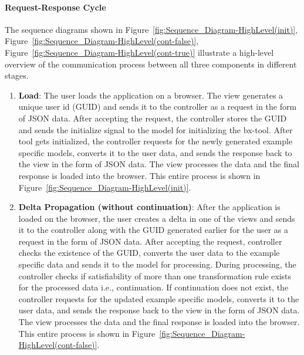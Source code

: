 \paragraph{Request-Response Cycle} 
The sequence diagrams shown in Figure~\ref{fig:Sequence_Diagram-HighLevel(init)}, Figure~\ref{fig:Sequence_Diagram-HighLevel(cont-false)}, Figure~\ref{fig:Sequence_Diagram-HighLevel(cont-true)} illustrate a high-level overview of the communication process between all three components in different stages.
\begin{enumerate}
	\item {\textbf{Load}: The user loads the application on a browser. The view generates a unique user id (GUID) and sends it to the controller as a request in the form of JSON data. After accepting the request, the controller stores the GUID and sends the initialize signal to the model for initializing the bx-tool. After tool gets initialized, the controller requests for the newly generated example specific models, converts it to the user data, and sends the response back to the view in the form of JSON data. The view processes the data and the final response is loaded into the browser. This entire process is shown in Figure~\ref{fig:Sequence_Diagram-HighLevel(init)}.}
	
	\item {\textbf{Delta Propagation (without continuation)}: After the application is loaded on the browser, the user creates a delta in one of the views and sends it to the controller along with the GUID generated earlier for the user as a request in the form of JSON data. After accepting the request, controller checks the existence of the GUID, converts the user data to the example specific data and sends it to the model for processing. During processing, the controller checks if satisfiability of more than one transformation rule exists for the processed data i.e., continuation. If continuation does not exist, the controller requests for the updated example specific models, converts it to the user data, and sends the response back to the view in the form of JSON data. The view processes the data and the final response is loaded into the browser. This entire process is shown in Figure~\ref{fig:Sequence_Diagram-HighLevel(cont-false)}.}
	

\end{enumerate}
